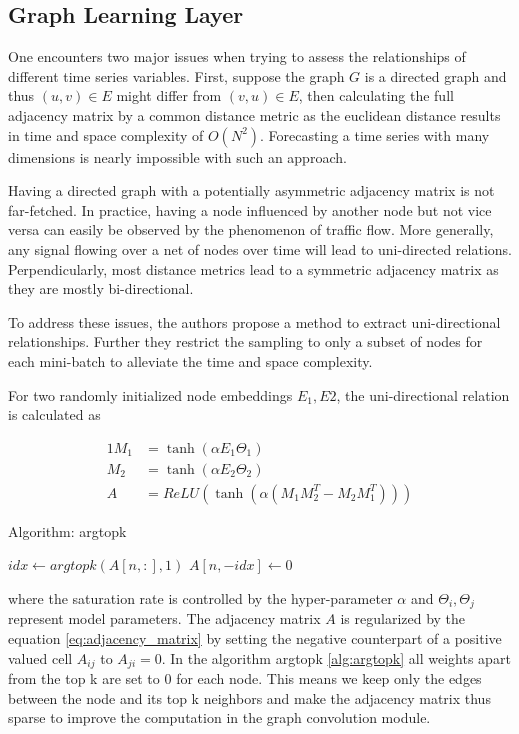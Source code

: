 \documentclass[letterpaper, twocolumn,11pt]{article}
\begin{document}
    \subsection{Graph Learning Layer}
    One encounters two major issues when trying to assess the relationships of different time series variables.
    First, suppose the graph $G$ is a directed graph and thus $(u,v)\in E$ might differ from $(v,u)\in E$,
    then calculating the full adjacency matrix by a common distance metric as the euclidean distance results in time and space complexity of $O(N^2)$.
    Forecasting a time series with many dimensions is nearly impossible with such an approach.

    Having a directed graph with a potentially asymmetric adjacency matrix is not far-fetched.
    In practice, having a node influenced by another node but not vice versa can easily be observed by the phenomenon of traffic flow.
    More generally, any signal flowing over a net of nodes over time will lead to uni-directed relations.
    Perpendicularly, most distance metrics lead to a symmetric adjacency matrix as they are mostly bi-directional.

    To address these issues, the authors propose a method to extract uni-directional relationships. Further they restrict the sampling
    to only a subset of nodes for each mini-batch to alleviate the time and space complexity.

    For two randomly initialized node embeddings $E_1, E2$, the uni-directional relation is calculated as

    \begin{alignat}{1}
        M_1 &= \tanh (\alpha E_1 \Theta_1) \\
        M_2 &= \tanh (\alpha E_2 \Theta_2)  \\
        A &= ReLU(\tanh (\alpha(M_1 M_2^T - M_2 M_1^T))) \label{eq:adjacency_matrix}
    \end{alignat}
    \begin{algorithm}
        \caption{Algorithm: argtopk}\label{alg:argtopk}
        \begin{algorithmic}[1]
                \State $idx \gets argtopk(A[n,:], 1)$
                \State $A[n, -idx] \gets 0$
            \EndFor
        \end{algorithmic}
    \end{algorithm}
    where the saturation rate is controlled by the hyper-parameter $\alpha$ and  $\Theta_i, \Theta_j$ represent
    model parameters. The adjacency matrix $A$ is regularized by the equation \ref{eq:adjacency_matrix}
    by setting the negative counterpart of a positive valued cell $A_{ij}$ to $A_{ji} = 0$. In the algorithm argtopk \ref{alg:argtopk}
    all weights apart from the top k are set to 0 for each node.
    This means we keep only the edges between the node and its top k neighbors and make the adjacency matrix thus sparse to improve the computation in the graph convolution module.
\end{document}
